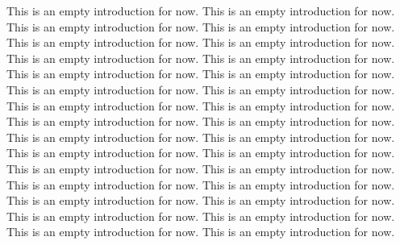 This is an empty introduction for now. This is an empty introduction for now. This is an empty introduction for now. This is an empty introduction for now. This is an empty introduction for now. This is an empty introduction for now. This is an empty introduction for now. This is an empty introduction for now. This is an empty introduction for now. This is an empty introduction for now. This is an empty introduction for now. This is an empty introduction for now. This is an empty introduction for now. This is an empty introduction for now. This is an empty introduction for now. This is an empty introduction for now. This is an empty introduction for now. This is an empty introduction for now. This is an empty introduction for now. This is an empty introduction for now. This is an empty introduction for now. This is an empty introduction for now. This is an empty introduction for now. This is an empty introduction for now. This is an empty introduction for now. This is an empty introduction for now. This is an empty introduction for now. This is an empty introduction for now. This is an empty introduction for now. This is an empty introduction for now.